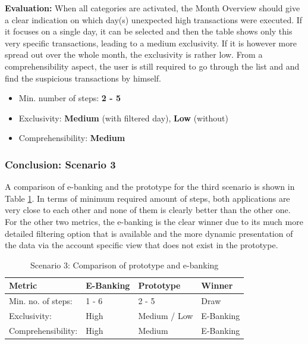 \textbf{Evaluation:} When all categories are activated, the Month Overview should give a clear indication on which day(s) unexpected high transactions were executed. If it focuses on a single day, it can be selected and then the table shows only this very specific transactions, leading to a medium exclusivity. If it is however more spread out over the whole month, the exclusivity is rather low. From a comprehensibility aspect, the user is still required to go through the list and and find the suspicious transactions by himself.
\begin{itemize}[noitemsep,nolistsep]
	\item Min. number of steps: \textbf{2 - 5}
	\item Exclusivity: \textbf{Medium} (with filtered day), \textbf{Low} (without)
	\item Comprehensibility: \textbf{Medium}
\end{itemize}



\subsubsection{Conclusion: Scenario 3}

A comparison of e-banking and the prototype for the third scenario is shown in Table \ref{tbl:scenariothreecomparison}. In terms of minimum required amount of steps, both applications are very close to each other and none of them is clearly better than the other one. For the other two metrics, the e-banking is the clear winner due to its much more detailed filtering option that is available and the more dynamic presentation of the data via the account specific view that does not exist in the prototype.
\begin{table}[h]
	\begin{center}
		\begin{tabular}{ | p{3.2cm} | p{3.8cm} | p{3.5cm} | p{2.5cm} | }
			\hline
			\textbf{Metric} & \textbf{E-Banking} & \textbf{Prototype} & \textbf{Winner} \\
			\hline
			Min. no. of steps: & 1 - 6 & 2 - 5 & Draw \\
			\hline
			Exclusivity: & High & Medium / Low & E-Banking \\
			\hline
			Comprehensibility: & High & Medium & E-Banking \\
			\hline
		\end{tabular}
		\caption{Scenario 3: Comparison of prototype and e-banking}
		\label{tbl:scenariothreecomparison}
	\end{center}
\end{table}


